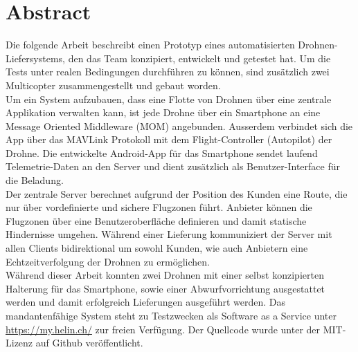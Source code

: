 \newpage
\cleardoublepage
{}
{}
\chapter*{Abstract}

Die folgende Arbeit beschreibt einen Prototyp eines automatisierten Drohnen-Liefersystems, den das Team konzipiert, entwickelt und getestet hat. Um die Tests unter realen Bedingungen durchführen zu können, sind zusätzlich zwei Multicopter zusammengestellt und gebaut worden.\\

Um ein System aufzubauen, dass eine Flotte von Drohnen über eine zentrale Applikation verwalten kann, ist jede Drohne über ein Smartphone an eine Message Oriented Middleware (\Gls{MOM}) angebunden. Ausserdem verbindet sich die App über das \Gls{MAVLink} Protokoll mit dem \Gls{Flight-Controller} (Autopilot) der Drohne. 
Die entwickelte Android-App für das Smartphone sendet laufend Telemetrie-Daten an den Server und dient zusätzlich als Benutzer-Interface für die Beladung. \\

Der zentrale Server berechnet aufgrund der Position des Kunden eine Route, die nur über vordefinierte und sichere Flugzonen führt. Anbieter können die Flugzonen über eine Benutzeroberfläche definieren und damit statische Hindernisse umgehen. Während einer Lieferung kommuniziert der Server mit allen Clients bidirektional um sowohl Kunden, wie auch Anbietern eine Echtzeitverfolgung der Drohnen zu ermöglichen. \\

Während dieser Arbeit konnten zwei Drohnen mit einer selbst konzipierten Halterung für das Smartphone, sowie einer Abwurfvorrichtung ausgestattet werden und damit erfolgreich Lieferungen ausgeführt werden. Das mandantenfähige System steht zu Testzwecken als Software as a Service unter \url{https://my.helin.ch/} zur freien Verfügung. Der Quellcode wurde unter der MIT-Lizenz auf Github veröffentlicht.
